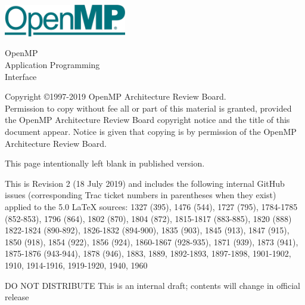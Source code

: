 
  \begin{titlepage}
    \begin{flushleft}
     \hspace{-6em} \includegraphics[width=0.4\textwidth]{openmp-logo.png}
    \end{flushleft}

    \begin{adjustwidth}{-0.75in}{0in}
    \begin{center}
      \Huge
      \textsf{OpenMP\\Application Programming\\Interface}

      \vspace{0.5in}\textsf{    }\vspace{-0.7in}
      \normalsize

      \vspace{1.0in}

      \textbf{\ompversion{}}
    \end{center}
    \end{adjustwidth}

    \vspace{3.0in}

\begin{adjustwidth}{0pt}{1em}\setlength{\parskip}{0.25\baselineskip}%
Copyright \copyright 1997-2019 OpenMP Architecture Review Board.\\
Permission to copy without fee all or part of this material is granted,
provided the OpenMP Architecture Review Board copyright notice and
the title of this document appear. Notice is given that copying is by
permission of the OpenMP Architecture Review Board.\end{adjustwidth}

  \end{titlepage}


\clearpage
\thispagestyle{empty}
\phantom{a}
This page intentionally left blank in published version.

This is Revision 2 (18 July 2019) and includes the following internal 
GitHub issues (corresponding Trac ticket numbers in parentheses when
they exist) applied to the 5.0 LaTeX sources: 1327 (395), 1476 (544), 
1727 (795), 1784-1785 (852-853), 1796 (864), 1802 (870), 1804 (872), 
1815-1817 (883-885), 1820 (888) 1822-1824 (890-892), 1826-1832 (894-900), 
1835 (903), 1845 (913), 1847 (915), 1850 (918), 1854 (922), 1856 (924), 
1860-1867 (928-935), 1871 (939), 1873 (941), 1875-1876 (943-944), 1878 (946), 
1883, 1889, 1892-1893, 1897-1898, 1901-1902, 1910, 1914-1916, 1919-1920, 
1940, 1960

DO NOT DISTRIBUTE
This is an internal draft; contents will change in official release

\vfill

